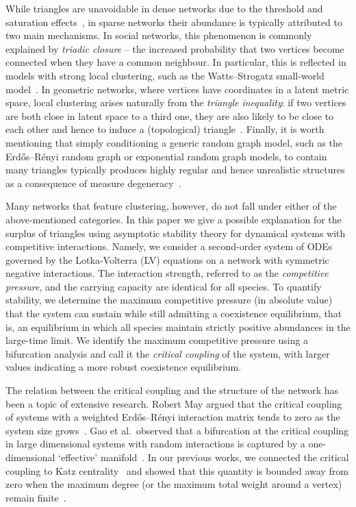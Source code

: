 \documentclass[a4paper,12pt]{article}
\begin{document}
While triangles are unavoidable in dense networks due to the threshold and saturation effects~\cite{bollobas2001}, in sparse networks their abundance is typically attributed to two main mechanisms.
In social networks, this phenomenon is commonly explained by \emph{triadic closure} -- the increased probability that two vertices become connected when they have a common neighbour.  In particular, this is reflected in models with strong local clustering, such as the Watts–Strogatz small‑world model~\cite{watts1998}.
In geometric networks, where vertices have coordinates in a latent metric space, local clustering arises naturally from the \emph{triangle inequality}: if two vertices are both close in latent space to a third one, they are also likely to be close to each other and hence to induce a (topological) triangle~\cite{boguna2021}. 
Finally, it is worth mentioning that simply conditioning a generic random graph model, such as the Erdős–Rényi random graph or exponential random graph models, to contain many triangles typically produces highly regular and hence unrealistic structures as a consequence of measure degeneracy~\cite{chakraborty2026,chatterjee2013estimating}.

Many networks that feature clustering, however, do not fall under either of the above‑mentioned categories. 
In this paper we give a possible explanation for the surplus of triangles using asymptotic stability theory for dynamical systems with competitive interactions.
Namely, we consider a second-order system of ODEs governed by the Lotka-Volterra (LV) equations on a network with symmetric negative interactions. The interaction strength, referred to as the \emph{competitive pressure}, and the carrying capacity are identical for all species. To quantify stability, we determine the maximum competitive pressure (in absolute value) that the system can sustain while still admitting a coexistence equilibrium, that is, an equilibrium in which all species maintain strictly positive abundances in the large‑time limit. We identify the maximum competitive pressure using a bifurcation analysis and call it the \emph{critical coupling} of the system, with larger values indicating a more robust coexistence equilibrium.

The relation between the critical coupling and the structure of the network has been a topic of extensive research. Robert May argued that the critical coupling of systems with a weighted Erd\H{o}s--R\'enyi interaction matrix tends to zero as the system size grows~\cite{may1972will}. 
Gao et al.\ observed that a bifurcation at the critical coupling in large dimensional systems with random interactions is captured by a one-dimensional ‘effective’ manifold~\cite{gao2016universal}.
In our previous works, we connected the critical coupling to Katz centrality~\cite{mooij2024findinglargeindependentsets} and showed that this quantity is bounded away from zero when the maximum degree (or the maximum total weight around a vertex) remain finite~\cite{mooij2024stablecoexistenceindefinitelylarge}.
\end{document}
